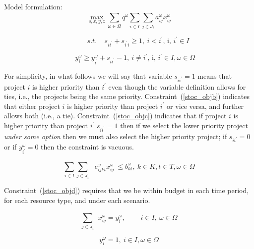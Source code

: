 Model formulation:\\

\begin{equation}\label{stoc_obja}
\mathop{\max}_{s,x,y,z} \sum _{ \omega  \in  \Omega }^{}q^{ \omega } \sum _{i \in I}^{} \sum _{j \in J_{i}}^{}a_{ij}^{ \omega }x_{ij}^{ \omega }
\end{equation}

\begin{equation}\label{stoc_objb}
~~~~~~~~~~~~s.t.~~~~~s_{ii^{'}}+s_{i^{'}i} \geq 1,~ i<i^{'}\text{, i, }i^{'} \in I
\end{equation}

\begin{equation}\label{stoc_objc}
~~~~~~~~y_{i}^{ \omega } \geq y_{i^{'}}^{ \omega }+s_{ii^{'}}-1,~ i \neq i^{'}\text{, i, }i^{'} \in I,  \omega  \in  \Omega
\end{equation}

For simplicity, in what follows we will say that variable $s_{ii^{'}}=1$  means that project
$i$  is higher priority than $i^{'}$  even though the variable definition allows for ties,
i.e., the projects being the same priority. Constraint~(\ref{stoc_objb}) indicates that either
project  $i$  is higher priority than project  $i^{'}$  or vice versa, and further allows both
(i.e., a tie). Constraint~(\ref{stoc_objc}) indicates that if project  $i$  is higher priority
than project  $i^{'}$  $s_{ii^{'}}=1$  then if we select the lower priority project
\textit{under some option} then we must also select the higher priority project; if  $s_{ii^{'}}=0$
or if  $y_{i^{'}}^{\omega}=0$  then the constraint is vacuous.\par

\begin{equation}\label{stoc_objd}
 \sum _{i \in I}^{} \sum _{j \in J_{i}}^{}\text{~ c}_{ijkt}^{ \omega }x_{ij}^{ \omega }~  \leq  b_{kt}^{ \omega },~ k \in K, t \in T,  \omega  \in  \Omega
\end{equation}

Constraint~(\ref{stoc_objd}) requires that we be within budget in each time period, for each resource type, and under each scenario.

\begin{equation}\label{stoc_obje}
 \sum _{j \in J_{i}}^{}~~x_{ij}^{ \omega }= y_{i}^{ \omega },~~~~~~~~~~i \in I,~ \omega  \in  \Omega
\end{equation}

\begin{equation}\label{stoc_objf}
y_{i}^{ \omega }=1,~ i \in I,  \omega  \in  \Omega
\end{equation}

